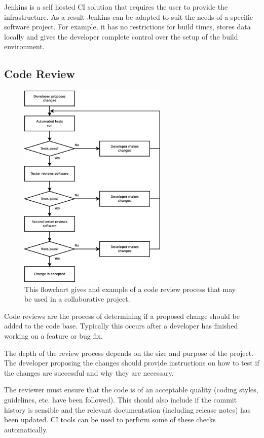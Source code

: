 \documentclass[jnr]{iosart2x}
\begin{document}
Jenkins \cite{Jenkins} is a self hosted CI solution that requires the user to provide the infrastructure.
As a result Jenkins can be adapted to suit the needs of a specific software project.
For example, it has no restrictions for build times, stores data locally and gives the developer complete control over the setup of the build environment.

\subsection{Code Review}
\label{Code review}

\begin{figure}
    \centering
    \includegraphics[height=10cm]{code_review_process.eps}
    \caption{This flowchart gives and example of a code review process that may be used in a collaborative project.}
    \label{Code_Review_Process}
\end{figure}

Code reviews  are the process of determining if a proposed change should be added to the code base.
Typically this occurs after a developer has finished working on a feature or bug fix.

The depth of the review process depends on the size and purpose of the project.
The developer proposing the changes should provide instructions on how to test if the changes are successful and why they are necessary.

The reviewer must ensure that the code is of an acceptable quality (coding styles, guidelines, etc. have been followed).
This should also include if the commit history is sensible and the relevant documentation (including release notes) has been updated.
CI tools can be used to perform some of these checks automatically.
\end{document}
